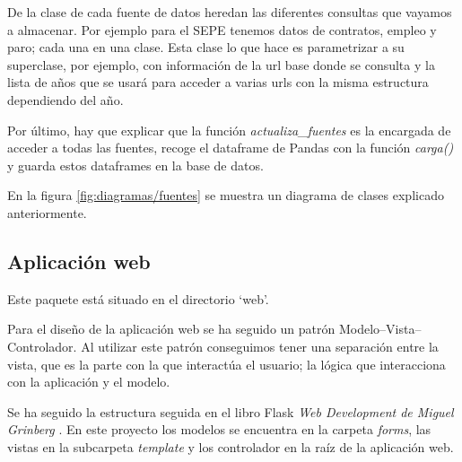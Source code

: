 De la clase de cada fuente de datos heredan las diferentes consultas que vayamos a almacenar. Por ejemplo para el SEPE tenemos datos de contratos, empleo y paro; cada una en una clase. Esta clase lo que hace es parametrizar a su superclase, por ejemplo, con información de la url base donde se consulta y la lista de años que se usará para acceder a varias urls con la misma estructura dependiendo del año.

Por último, hay que explicar que la función \textit{actualiza\_fuentes} es la encargada de acceder a todas las fuentes, recoge el dataframe de Pandas con la función \textit{carga()} y guarda estos dataframes en la base de datos.

En la figura \ref{fig:diagramas/fuentes} se muestra un diagrama de clases explicado anteriormente.


\subsection{Aplicación web}

Este paquete está situado en el directorio `web'.

Para el diseño de la aplicación web se ha seguido un patrón Modelo--Vista--Controlador. Al utilizar este patrón conseguimos tener una separación entre la vista, que es la parte con la que interactúa el usuario; la lógica que interacciona con la aplicación y el modelo.


Se ha seguido la estructura seguida en el libro Flask \textit{Web Development de Miguel Grinberg} \cite{book:flask}. En este proyecto los modelos se encuentra en la carpeta \textit{forms}, las vistas en la subcarpeta \textit{template} y los controlador en la raíz de la aplicación web.
